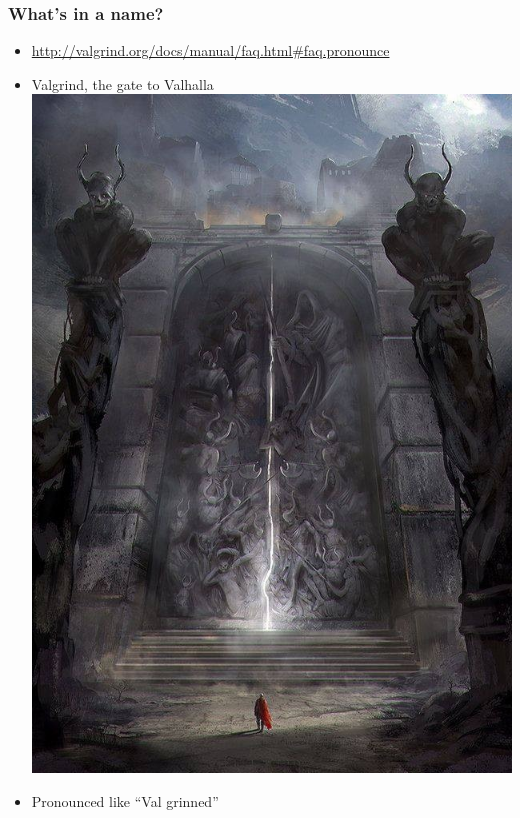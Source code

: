 \documentclass{beamer}
\begin{document}
\begin{frame}[fragile]
\frametitle{What's in a name?}
\begin{itemize}
\item \url{http://valgrind.org/docs/manual/faq.html#faq.pronounce}
\item Valgrind, the gate to Valhalla \\
\includegraphics[height=0.3\textheight]{gate.jpg} 
\item Pronounced like ``Val grinned'' \\

\end{itemize}
\end{frame}
\end{document}
